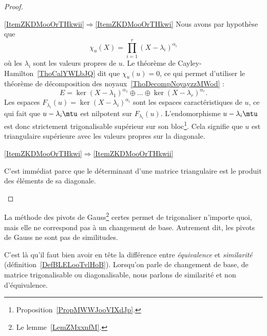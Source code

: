 \begin{proof}
    \begin{subproof}
        \item[\ref{ItemZKDMooOrTHkwii}\( \Rightarrow\)\ref{ItemZKDMooOrTHkwi}]
            Nous avons par hypothèse que
            \begin{equation}
                \chi_u(X)=\prod_{i=1}^r(X-\lambda_i)^{\alpha_i}
            \end{equation}
            où les \( \lambda_i\) sont les valeurs propres de \( u\). Le théorème de Cayley-Hamilton~\ref{ThoCalYWLbJQ} dit que \( \chi_u(u)=0\), ce qui permet d'utiliser le théorème de décomposition des noyaux~\ref{ThoDecompNoyayzzMWod} :
            \begin{equation}
                E=\ker(X-\lambda_1)^{\alpha_1}\oplus\ldots\oplus\ker(X-\lambda_r)^{\alpha_r}.
            \end{equation}
            Les espaces \( F_{\lambda_i}(u)=\ker(X-\lambda_i)^{\alpha_i}\) sont les espaces caractéristiques de \( u\), ce qui fait que \( u-\lambda_i\mtu\) est nilpotent sur \( F_{\lambda_i}(u)\). L'endomorphisme \( u-\lambda_i\mtu\) est donc strictement trigonalisable supérieur sur son bloc\footnote{Proposition~\ref{PropMWWJooVIXdJp}.}. Cela signifie que \( u\) est triangulaire supérieure avec les valeurs propres sur la diagonale.

        \item[\ref{ItemZKDMooOrTHkwi}\( \Rightarrow\)\ref{ItemZKDMooOrTHkwii}]

            C'est immédiat parce que le déterminant d'une matrice triangulaire est le produit des éléments de sa diagonale.
    \end{subproof}
\end{proof}

\begin{remark}
    La méthode des pivots de Gauss\footnote{Le lemme~\ref{LemZMxxnfM}.} certes permet de trigonaliser n'importe quoi, mais elle ne correspond pas à un changement de base. Autrement dit, les pivots de Gauss ne sont pas de similitudes.

    C'est là qu'il faut bien avoir en tête la différence entre \emph{équivalence} et \emph{similarité} (définition~\ref{DefBLELooTvlHoB}). Lorsqu'on parle de changement de base, de matrice trigonalisable ou diagonalisable, nous parlons de similarité et non d'équivalence.
\end{remark}

